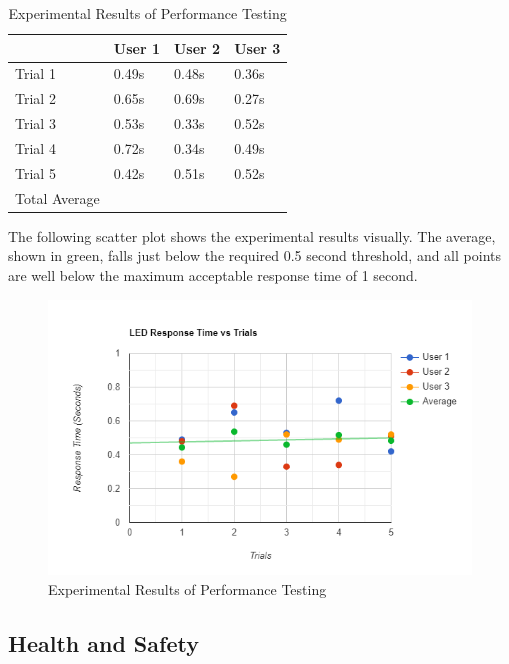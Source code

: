 \documentclass[12pt, titlepage]{article}
\begin{document}
\begin{table}[H]
    \centering
    \setlength{\leftmargini}{0.4cm}
    \begin{tabular}{| >{\centering\arraybackslash}m{4cm} | 
        >{\centering\arraybackslash}m{3cm} |
        >{\centering\arraybackslash}m{3cm} | 
        >{\centering\arraybackslash}m{3cm} |}
    \hline
    \rowcolor[gray]{0.9}
    & User 1 & User 2 & User 3 \\
    \hline
    Trial 1 & 0.49s & 0.48s & 0.36s \\
    \hline
    Trial 2 & 0.65s & 0.69s & 0.27s \\
    \hline
    Trial 3 & 0.53s & 0.33s & 0.52s \\
    \hline
    Trial 4 & 0.72s & 0.34s & 0.49s \\
    \hline
    Trial 5 & 0.42s & 0.51s & 0.52s \\
    \hline
    Total Average & \multicolumn{3}{c|}{\textbf{0.488s}}\\
    \hline
    \end{tabular}
\caption{Experimental Results of Performance Testing}
\end{table}

The following scatter plot shows the experimental results visually. The average, shown in green, falls just below the 
required 0.5 second threshold, and all points are well below the maximum acceptable response time of 1 second.

\begin{figure}[H]
    \includegraphics[scale=0.93]{performanceScatterPlot}
    \caption{Experimental Results of Performance Testing}
\end{figure}

\newpage
\subsection{Health and Safety}
\end{document}
